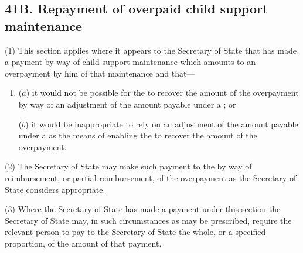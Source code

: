 \documentclass[a4paper]{article}
\begin{document}
\subsection{41B. Repayment of overpaid child support maintenance}

(1) This section applies where it appears to the Secretary of State that  has made a payment by way of child support maintenance which amounts to an overpayment by him of that maintenance and that---
\begin{enumerate}\item[]
($a$) it would not be possible for the  to recover the amount of the overpayment by way of an adjustment of the amount payable under a ; or

($b$) it would be inappropriate to rely on an adjustment of the amount payable under a  as the means of enabling the  to recover the amount of the overpayment.
\end{enumerate}


(2)
The Secretary of State may make such payment to the  by way of reimbursement, or partial reimbursement, of the overpayment as the Secretary of State considers appropriate.

(3)
Where the Secretary of State has made a payment under this section the Secretary of State may, in such circumstances as may be prescribed, require the relevant person to pay to the Secretary of State the whole, or a specified proportion, of the amount of that payment.
\end{document}
